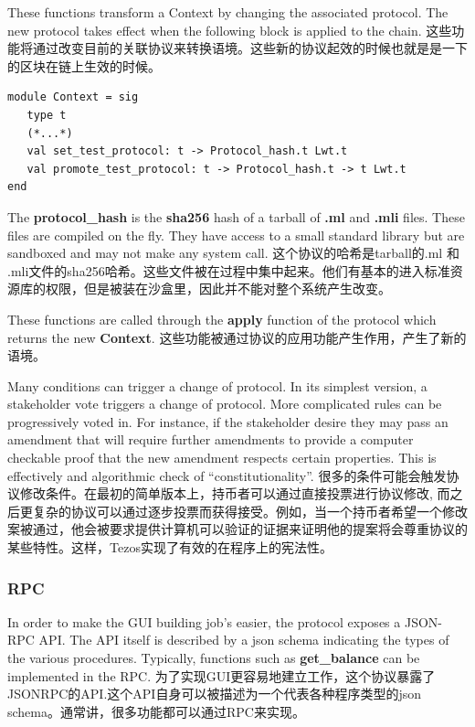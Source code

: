 \documentclass[letterpaper]{article}
\begin{document}
These functions transform a Context by changing the associated protocol.
The new protocol takes effect when the following block is applied to the chain.
这些功能将通过改变目前的关联协议来转换语境。这些新的协议起效的时候也就是是一下的区块在链上生效的时候。

\begin{lstlisting}
module Context = sig
   type t
   (*...*)
   val set_test_protocol: t -> Protocol_hash.t Lwt.t
   val promote_test_protocol: t -> Protocol_hash.t -> t Lwt.t
end
\end{lstlisting}

The \textbf{protocol\_hash} is the \textbf{sha256} hash of a tarball of
\textbf{.ml} and \textbf{.mli} files. These files are compiled on the
fly. They have access to a small standard library but are sandboxed
and may not make any system call.
这个协议的哈希是tarball的.ml 和 .mli文件的sha256哈希。这些文件被在过程中集中起来。他们有基本的进入标准资源库的权限，但是被装在沙盒里，因此并不能对整个系统产生改变。

These functions are called through the \textbf{apply} function of the protocol
which returns the new \textbf{Context}.
这些功能被通过协议的应用功能产生作用，产生了新的语境。

Many conditions can trigger a change of protocol. In its simplest version,
a stakeholder vote triggers a change of protocol. More complicated rules
can be progressively voted in. For instance, if the stakeholder desire they
may pass an amendment that will require further amendments to provide a
computer checkable proof that the new amendment respects certain properties.
This is effectively and algorithmic check of ``constitutionality''.
很多的条件可能会触发协议修改条件。在最初的简单版本上，持币者可以通过直接投票进行协议修改, 而之后更复杂的协议可以通过逐步投票而获得接受。例如，当一个持币者希望一个修改案被通过，他会被要求提供计算机可以验证的证据来证明他的提案将会尊重协议的某些特性。这样，Tezos实现了有效的在程序上的宪法性。

\subsubsection{RPC}
In order to make the GUI building job's easier, the protocol exposes a JSON-RPC
API. The API itself is described by a json schema indicating the types of the
various procedures. Typically, functions such as \textbf{get\_balance} can
be implemented in the RPC.
为了实现GUI更容易地建立工作，这个协议暴露了JSONRPC的API.这个API自身可以被描述为一个代表各种程序类型的json schema。通常讲，很多功能都可以通过RPC来实现。
\end{document}
